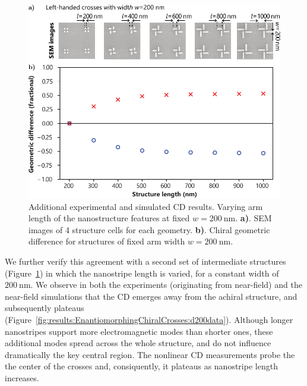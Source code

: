 \begin{figure}[htb!]	
    \centering	
    \includegraphics[scale=1]{./figures/results/EnantiomorphingChiralCrosses/d200structures.pdf}
    \caption{\label{fig:results:EnantiomorphingChiralCrosses:d200structures}
    Additional experimental and simulated CD results. Varying arm length of the nanostructure features at fixed $w=\SI{200}{\nano\m}$. \textbf{a)}. SEM images of 4 structure cells for each geometry. \textbf{b)}. Chiral geometric difference for structures of fixed arm width $w=\SI{200}{\nano\m}$.}	
\end{figure}

We further verify this agreement with a second set of intermediate structures (Figure~\ref{fig:results:EnantiomorphingChiralCrosses:d200structures}) in which the nanostripe length is varied, for a constant width of $\SI{200}{\nano\m}$. We observe in both the experiments (originating from near-field) and the near-field simulations that the CD emerges away from the achiral structure, and subsequently plateaus (Figure~\ref{fig:results:EnantiomorphingChiralCrosses:d200data}). Although longer nanostripes support more electromagnetic modes than shorter ones, these additional modes spread across the whole structure, and do not influence dramatically the key central region. The nonlinear CD measurements probe the the center of the crosses and, consiquently, it plateaus as nanostripe length increases.

